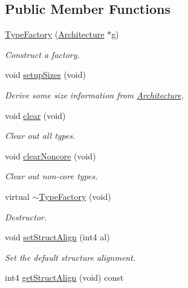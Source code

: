 \subsection*{Public Member Functions}
\begin{DoxyCompactItemize}
\item 
\mbox{\hyperlink{class_type_factory_a68a14752ee51f674664cce90522fe559}{Type\+Factory}} (\mbox{\hyperlink{class_architecture}{Architecture}} $\ast$g)
\begin{DoxyCompactList}\small\item\em Construct a factory. \end{DoxyCompactList}\item 
void \mbox{\hyperlink{class_type_factory_afae3189d62867e5358bcbb98e7723b75}{setup\+Sizes}} (void)
\begin{DoxyCompactList}\small\item\em Derive some size information from \mbox{\hyperlink{class_architecture}{Architecture}}. \end{DoxyCompactList}\item 
void \mbox{\hyperlink{class_type_factory_a8497930bbd88dd89d91536de06a79f3f}{clear}} (void)
\begin{DoxyCompactList}\small\item\em Clear out all types. \end{DoxyCompactList}\item 
void \mbox{\hyperlink{class_type_factory_afa4b55a83c2f6dbb6f4f13b5ca930ae4}{clear\+Noncore}} (void)
\begin{DoxyCompactList}\small\item\em Clear out non-\/core types. \end{DoxyCompactList}\item 
virtual \mbox{\hyperlink{class_type_factory_a2d006876061f78e680f8697a335399d5}{$\sim$\+Type\+Factory}} (void)
\begin{DoxyCompactList}\small\item\em Destructor. \end{DoxyCompactList}\item 
void \mbox{\hyperlink{class_type_factory_aa0ffda99be9ec6acf0bc8a963021e050}{set\+Struct\+Align}} (int4 al)
\begin{DoxyCompactList}\small\item\em Set the default structure alignment. \end{DoxyCompactList}\item 
int4 \mbox{\hyperlink{class_type_factory_a12e578b99d47a8d6f46edeb1a3f79db4}{get\+Struct\+Align}} (void) const

\end{DoxyCompactItemize}
